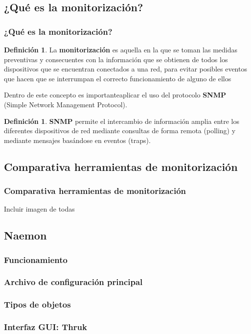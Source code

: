 \documentclass{beamer}
\theoremstyle{plain}
\theoremstyle{definition}
\newtheorem{defn}[thm]{Definici\'{o}n}
\theoremstyle{plain}
\theoremstyle{definition}
\theoremstyle{remark}
\theoremstyle{definition}
\begin{document}
\subsection{¿Qué es la monitorización?}
\begin{frame}
	\frametitle{¿Qué es la monitorización?}
	\begin{defn}
		La \textbf{monitorización} es aquella en la que se toman las medidas preventivas y
		consecuentes con la información que se obtienen de todos los dispositivos
		que se encuentran conectados a una red, para evitar posibles eventos que
		hacen que se interrumpan el correcto funcionamiento de alguno de ellos
	\end{defn}
Dentro de este concepto es importanteaplicar el uso del protocolo \textbf{SNMP} (Simple Network
Management Protocol).
\begin{defn}
	\textbf{SNMP} permite el intercambio de información amplia entre los diferentes dispositivos de red mediante consultas de forma remota (polling) y mediante mensajes basándose en eventos (traps).
\end{defn}

	
\end{frame}

\subsection{Comparativa herramientas de monitorización}
\begin{frame}
	\frametitle{Comparativa herramientas de monitorización}
	Incluir imagen de todas	
\end{frame}

\subsection{Naemon}
\begin{frame}
	\frametitle{Funcionamiento}
	
\end{frame}
\begin{frame}
	\frametitle{Archivo de configuración principal}
		
\end{frame}

\begin{frame}
	\frametitle{Tipos de objetos}
	
\end{frame}

\begin{frame}
	\frametitle{Interfaz GUI: Thruk}
	
\end{frame}
\end{document}
